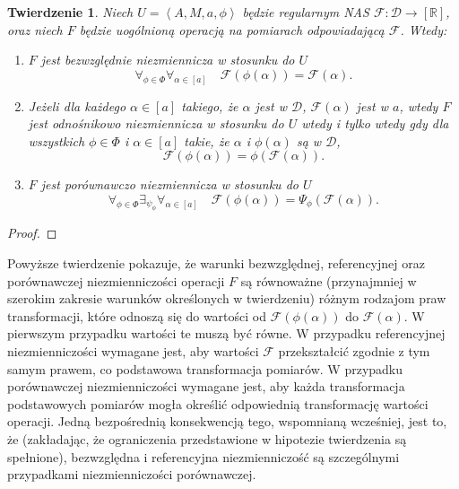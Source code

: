 \documentclass[12pt,a4paper]{report}
\newtheorem{tw}[definition]{Twierdzenie}
\newcommand{\domkniecie}[1]{\left\lbrack{#1}\right\rbrack}
\newcommand{\tuple}[1]{\left\langle {#1} \right\rangle}
\begin{document}
\begin{tw}
Niech $U=\tuple{A,M,a,\phi}$ będzie regularnym NAS $\mathcal{F}:\mathcal{D}\to \domkniecie{\mathbb{R}}$, oraz niech $F$ będzie uogólnioną operacją na pomiarach odpowiadającą $\mathcal{F}$. Wtedy:
\begin{enumerate}
\item
$F$ jest bezwzględnie niezmiennicza w stosunku do $U$ 
$$
\forall_{\phi \in \Phi} \forall_{\alpha \in \domkniecie{a}} \quad \mathcal{F}(\phi(\alpha))=\mathcal{F}(\alpha).
$$
\item
Jeżeli dla każdego $\alpha \in \domkniecie{a}$ takiego, że $\alpha$ jest w $\mathcal{D}$, $\mathcal{F}(\alpha)$ jest w $a$, wtedy $F$ jest odnośnikowo niezmiennicza w stosunku do $U$ wtedy i tylko wtedy gdy dla wszystkich $\phi \in \Phi$ i $\alpha \in \domkniecie{a}$ takie, że $\alpha$ i $\phi(\alpha)$ są w $\mathcal{D}$,
\begin{equation*}
\mathcal{F}(\phi(\alpha))=\phi(\mathcal{F}(\alpha)).
\end{equation*}
\item
$F$ jest porównawczo niezmiennicza w stosunku do $U$  $$
\forall_{\phi \in \Phi}  \exists_{\psi_{\phi}} \forall_{\alpha \in \domkniecie{a}} \quad \mathcal{F}(\phi(\alpha))=\Psi_{\phi}(\mathcal{F}(\alpha)).
$$
\end{enumerate}
\end{tw}
\begin{proof}

\end{proof}
Powyższe twierdzenie pokazuje, że warunki bezwzględnej, referencyjnej oraz porównawczej niezmienniczości operacji $F$ są równoważne (przynajmniej w szerokim zakresie warunków określonych w twierdzeniu) różnym rodzajom praw transformacji, które odnoszą się do wartości od $\mathcal{F}(\phi(\alpha))$ do $\mathcal{F}(\alpha)$. W pierwszym przypadku wartości te muszą być równe. W przypadku referencyjnej niezmienniczości wymagane jest, aby wartości $\mathcal{F}$ przekształcić zgodnie z tym samym prawem, co podstawowa transformacja pomiarów. W przypadku porównawczej niezmienniczości  wymagane jest, aby każda transformacja podstawowych pomiarów mogła określić odpowiednią transformację wartości operacji. Jedną bezpośrednią konsekwencją tego, wspomnianą wcześniej, jest to, że (zakładając, że ograniczenia przedstawione w hipotezie twierdzenia są spełnione), bezwzględna i referencyjna niezmienniczość są szczególnymi przypadkami niezmienniczości porównawczej.
\end{document}
